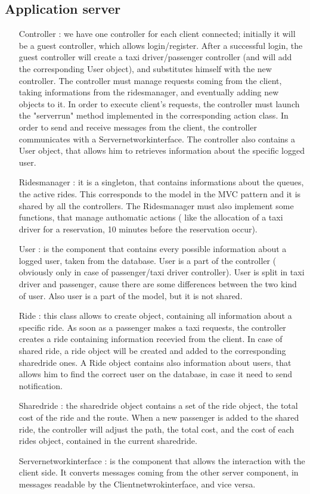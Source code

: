	\subsection{Application server}
	\begin{itemize}
	 \item [Controller]: we have one controller for each client connected; initially it will be a guest controller,
	 which allows login/register. After a successful login, the guest controller will create a taxi driver/passenger controller (and will add the corresponding User object),
	 and substitutes himself with the new controller. The controller must manage requests coming from
	 the client, taking informations from the ridesmanager, and eventually adding new objects to it.
	 In order to execute client's requests, the controller must launch the "serverrun" method implemented in the corresponding action class.
	 In order to send and receive messages from the client, the controller communicates with a Servernetworkinterface.
	 The controller also contains a User object, that allows him to retrieves information about the specific logged user.
	 \item [Ridesmanager]: it is a singleton, that contains informations about the queues, the active rides. This corresponds 
	 to the model in the MVC pattern and it is shared by all the controllers.
	 The Ridesmanager must also implement some functions, that manage authomatic actions ( like the allocation of a taxi driver for a reservation,
	 10 minutes before the reservation occur).
	 \item [User]: is the component that contains every possible information about a logged user, taken from the database.
	 User is a part of the controller ( obviously only in case of passenger/taxi driver controller).
	 User is split in taxi driver and passenger, cause there are some differences between the two kind of user.
	 Also user is a part of the model, but it is not shared.
	 \item[Ride]: this class allows to create object, containing all information about a specific ride. 
	 As soon as a passenger makes a taxi requests, the controller creates a ride containing information recevied from the client.
	 In case of shared ride, a ride object will be created and added to the corresponding sharedride ones.
	 A Ride object contains also information about users, that allows him to find the correct user on the database, in case it need to send notification.
	 \item[Sharedride]: the sharedride object contains a set of the ride object, the total cost of the ride and the route.
	 When a new passenger is added to the shared ride, the controller will adjust the path, the total cost, and the cost of each
	 rides object, contained in the current sharedride.
	 \item[Servernetworkinterface]: is the component that allows the interaction with the client side. It converts messages coming from
	 the other server component, in messages readable by the Clientnetwrokinterface, and vice versa.
	\end{itemize}
